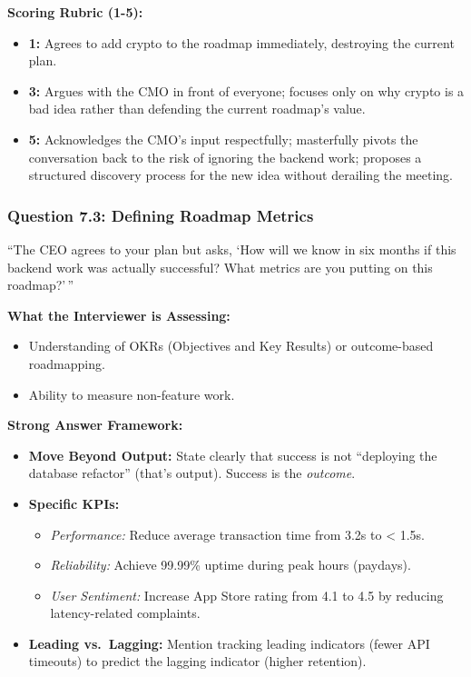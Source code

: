 \documentclass[
  11pt,
  openany,
  oneside]{book}
\providecommand{\tightlist}{%
  \setlength{\itemsep}{0pt}\setlength{\parskip}{0pt}}
\begin{document}
\textbf{Scoring Rubric (1-5):}

\begin{itemize}
\tightlist
\item
  \textbf{1:} Agrees to add crypto to the roadmap immediately,
  destroying the current plan.
\item
  \textbf{3:} Argues with the CMO in front of everyone; focuses only on
  why crypto is a bad idea rather than defending the current roadmap's
  value.
\item
  \textbf{5:} Acknowledges the CMO's input respectfully; masterfully
  pivots the conversation back to the risk of ignoring the backend work;
  proposes a structured discovery process for the new idea without
  derailing the meeting.
\end{itemize}

\subsubsection{Question 7.3: Defining Roadmap
Metrics}\label{question-7.3-defining-roadmap-metrics}

``The CEO agrees to your plan but asks, `How will we know in six months
if this backend work was actually successful? What metrics are you
putting on this roadmap?'\,''

\textbf{What the Interviewer is Assessing:}

\begin{itemize}
\tightlist
\item
  Understanding of OKRs (Objectives and Key Results) or outcome-based
  roadmapping.
\item
  Ability to measure non-feature work.
\end{itemize}

\textbf{Strong Answer Framework:}

\begin{itemize}
\tightlist
\item
  \textbf{Move Beyond Output:} State clearly that success is not
  ``deploying the database refactor'' (that's output). Success is the
  \emph{outcome}.
\item
  \textbf{Specific KPIs:}

  \begin{itemize}
  \tightlist
  \item
    \emph{Performance:} Reduce average transaction time from 3.2s to
    \textless{} 1.5s.
  \item
    \emph{Reliability:} Achieve 99.99\% uptime during peak hours
    (paydays).
  \item
    \emph{User Sentiment:} Increase App Store rating from 4.1 to 4.5 by
    reducing latency-related complaints.
  \end{itemize}
\item
  \textbf{Leading vs.~Lagging:} Mention tracking leading indicators
  (fewer API timeouts) to predict the lagging indicator (higher
  retention).
\end{itemize}
\end{document}
